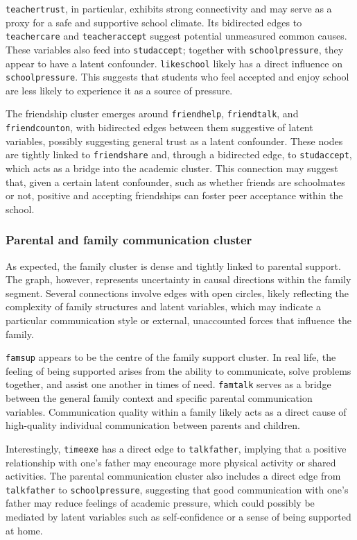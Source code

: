 \documentclass[main.tex]{subfiles}
\begin{document}
\texttt{teachertrust}, in particular, exhibits strong connectivity and may serve as a proxy for a safe and supportive school climate. Its bidirected edges to \texttt{teachercare} and \texttt{teacheraccept} suggest potential unmeasured common causes. These variables also feed into \texttt{studaccept}; together with \texttt{schoolpressure}, they appear to have a latent confounder. \texttt{likeschool} likely has a direct influence on \texttt{schoolpressure}. This suggests that students who feel accepted and enjoy school are less likely to experience it as a source of pressure.

The friendship cluster emerges around \texttt{friendhelp}, \texttt{friendtalk}, and \texttt{friendcounton}, with bidirected edges between them suggestive of latent variables, possibly suggesting general trust as a latent confounder. These nodes are tightly linked to \texttt{friendshare} and, through a bidirected edge, to \texttt{studaccept}, which acts  as a bridge into the academic cluster. This connection may suggest that, given a certain latent confounder, such as whether friends are schoolmates or not, positive and accepting friendships can foster peer acceptance within the school.

\subsubsection*{Parental and family communication cluster}

As expected, the family cluster is dense and tightly linked to parental support. The graph, however, represents uncertainty in causal directions within the family segment. Several connections involve edges with open circles, likely reflecting the complexity of family structures and latent variables, which may indicate a particular communication style or external, unaccounted forces that influence the family.

\texttt{famsup} appears to be the centre of the family support cluster. In real life, the feeling of being supported arises from the ability to communicate, solve problems together, and assist one another in times of need. \texttt{famtalk} serves as a bridge between the general family context and specific parental communication variables. Communication quality within a family likely acts as a direct cause of high-quality individual communication between parents and children.

Interestingly, \texttt{timeexe} has a direct edge to \texttt{talkfather}, implying that a positive relationship with one's father may encourage more physical activity or shared activities. The parental communication cluster also includes a direct edge from \texttt{talkfather} to \texttt{schoolpressure}, suggesting that good communication with one's father may reduce feelings of academic pressure, which could possibly be mediated by latent variables such as self-confidence or a sense of being supported at home.
\end{document}

